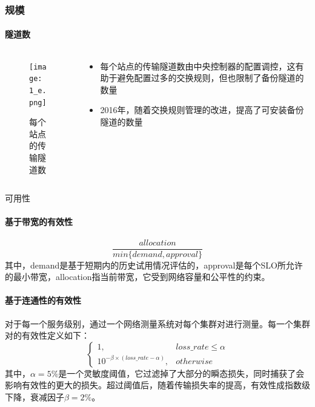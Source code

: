\begin{frame}
    \frametitle{规模}
    \framesubtitle{隧道数}
    \begin{columns}
        \begin{column}{0.4\textwidth}
            \begin{figure}
                \centering
                \texttt{[image: 1\_e.png]}
                \caption{每个站点的传输隧道数}
            \end{figure}
        \end{column}

        \begin{column}{0.6\textwidth}
            \begin{itemize}
                \item 每个站点的传输隧道数由中央控制器的配置调控，这有助于避免配置过多的交换规则，但也限制了备份隧道的数量
                \item 2016年，随着交换规则管理的改进，提高了可安装备份隧道的数量
            \end{itemize}
        \end{column}
    \end{columns}
\end{frame}

\begin{frame}{可用性}
    \paragraph{基于带宽的有效性}
    \begin{equation*}
        \frac{allocation}{min\{demand, approval\}}
    \end{equation*}
    其中，demand是基于短期内的历史试用情况评估的，approval是每个SLO所允许的最小带宽，allocation指当前带宽，它受到网络容量和公平性的约束。
    \paragraph{基于连通性的有效性}对于每一个服务级别，通过一个网络测量系统对每个集群对进行测量。每一个集群对的有效性定义如下：
    \begin{equation*}
        \begin{cases}
            1,                                    & loss\_rate\leq\alpha \\
            10^{-\beta\times(loss\_rate-\alpha)}, & otherwise
        \end{cases}
    \end{equation*}
    其中，$\alpha=5\%$是一个灵敏度阈值，它过滤掉了大部分的瞬态损失，同时捕获了会影响有效性的更大的损失。超过阈值后，随着传输损失率的提高，有效性成指数级下降，衰减因子$\beta=2\%$。
\end{frame}

